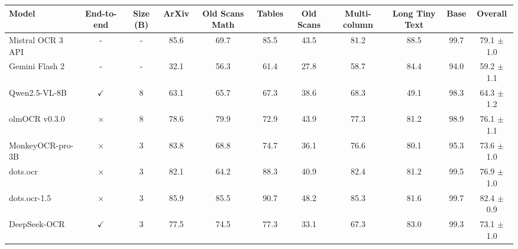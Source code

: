 \documentclass{article}
\begin{document}
\begin{table}[t]
\centering
\small
\setlength{\tabcolsep}{2pt}
\begin{adjustbox}{max width=\linewidth, keepaspectratio}
\begin{tabular}{lcccccccccc}
\toprule
\textbf{Model} & \textbf{End-to-end} & \textbf{Size (B)} & \textbf{ArXiv} & \textbf{Old Scans Math} & \textbf{Tables} & \textbf{Old Scans} & \textbf{Multi-column} & \textbf{Long Tiny Text} & \textbf{Base} & \textbf{Overall} \\
\midrule
Mistral OCR 3 API & - & - & 85.6 & 69.7 & 85.5 & 43.5 & 81.2 & 88.5 & 99.7 & 79.1 $\pm$ 1.0 \\
Gemini Flash 2 & - & - & 32.1 & 56.3 & 61.4 & 27.8 & 58.7 & 84.4 & 94.0 & 59.2 $\pm$ 1.1 \\
Qwen2.5-VL-8B & $\checkmark$ & 8 & 63.1 & 65.7 & 67.3 & 38.6 & 68.3 & 49.1 & 98.3 & 64.3 $\pm$ 1.2 \\
olmOCR v0.3.0 & $\times$ & 8 & 78.6 & 79.9 & 72.9 & 43.9 & 77.3 & 81.2 & 98.9 & 76.1 $\pm$ 1.1 \\
MonkeyOCR-pro-3B & $\times$ & 3 & 83.8 & 68.8 & 74.7 & 36.1 & 76.6 & 80.1 & 95.3 & 73.6 $\pm$ 1.0 \\
dots.ocr & $\times$ & 3 & 82.1 & 64.2 & 88.3 & 40.9 & 82.4 & 81.2 & 99.5 & 76.9 $\pm$ 1.0 \\
dots.ocr-1.5 & $\times$ & 3 & 85.9 & 85.5 & 90.7 & 48.2 & 85.3 & 81.6 & 99.7 & 82.4 $\pm$ 0.9 \\
DeepSeek-OCR & $\checkmark$ & 3 & 77.5 & 74.5 & 77.3 & 33.1 & 67.3 & 83.0 & 99.3 & 73.1 $\pm$ 1.0 \\

\end{tabular}
\end{adjustbox}
\end{table}
\end{document}
